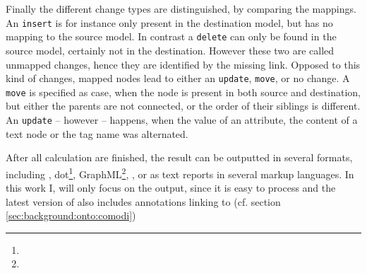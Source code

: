 	Finally the different change types are distinguished, by comparing the mappings. An \texttt{insert} is for instance only present in the destination model, but has no mapping to the source model. In contrast a \texttt{delete} can only be found in the source model, certainly not in the destination.
	However these two are called unmapped changes, hence they are identified by the missing link. Opposed to this kind of changes, mapped nodes lead to either an \texttt{update}, \texttt{move}, or no change.
	A \texttt{move} is specified as case, when the node is present in both source and destination, but either the parents are not connected, or the order of their siblings is different. An \texttt{update} -- however -- happens, when the value of an attribute, the content of a text node or the tag name was alternated.
	
	After all calculation are finished, the result can be outputted in several formats, including \xml, dot\footnote{}, GraphML\footnote{\todo{}}, \json, or as text reports in several markup languages.
	In this work I, will only focus on the \xml output, since it is easy to process and the latest version of \bives also includes \rdf annotations linking to \comodi (cf. section \ref{sec:background:onto:comodi}) \cite{Scharm2015}
	
